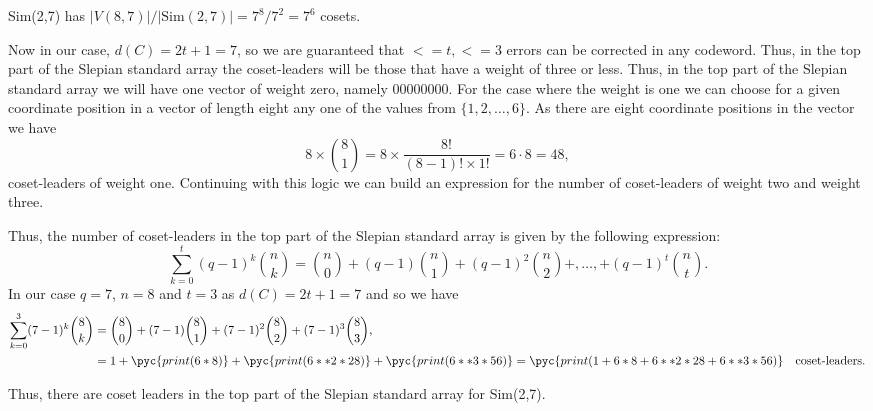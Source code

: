 Sim(2,7) has $\left|V(8,7)\right|/\left|\textrm{Sim}(2,7)\right| = 7^8/7^2 = 7^6$ cosets. 

Now in our case, $d(C) = 2t + 1 = 7$, so we are guaranteed that $<=t, <= 3$ errors can be corrected in any codeword. Thus, in the top part of the Slepian standard array the coset-leaders will be those that have a weight of three or less. Thus, in the top part of the Slepian standard array we will have one vector of weight zero, namely $00000000$. For the case where the weight is one we can choose for a given coordinate position in a vector of length eight any one of the values from $\{1,2,\ldots,6\}$. As there are eight coordinate positions in the vector we have
\[
	8\times\binom{8}{1} = 8\times\frac{8!}{(8-1)!\times1!} = 6\cdot8=48,
\]
coset-leaders of weight one. Continuing with this logic we can build an expression for the number of coset-leaders of weight two and weight three.

Thus, the number of coset-leaders in the top part of the Slepian standard array is given by the following expression:
\[
	\sum_{k=0}^t(q-1)^k\binom{n}{k}=\binom{n}{0} + (q-1)\binom{n}{1} + (q-1)^2\binom{n}{2} +,\ldots,+ (q-1)^t\binom{n}{t}. 
\]
In our case $q=7$, $n=8$ and $t=3$ as $d(C) = 2t + 1 = 7$ and so we have
\begin{align*}
	\sum_{k=0}^3(7-1)^k\binom{8}{k}&=\binom{8}{0} + (7-1)\binom{8}{1} + (7-1)^2\binom{8}{2} + (7-1)^3\binom{8}{3},\\
	&= 1 + \pyc{print(6*8)} + \pyc{print(6**2 * 28)} + \pyc{print(6**3 * 56)} = \pyc{print(1 + 6*8 + 6**2 * 28 + 6**3 * 56)}\quad\textrm{coset-leaders}.
\end{align*}

Thus, there are  coset leaders in the top part of the Slepian standard array for Sim(2,7). 



